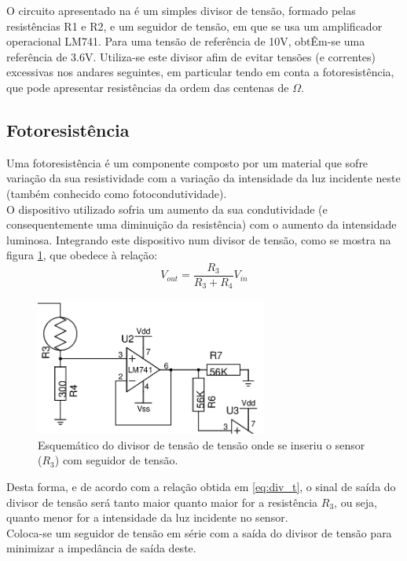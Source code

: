 \documentclass[%
  reprint,
  nofootinbib,
  amsmath,amssymb,
  aps,
  10pt,
  a4paper
]{revtex4-1}
\begin{document}

O circuito apresentado na  é um simples divisor de tensão, formado pelas resistências R1 e R2, e um seguidor de tensão, em que se usa um amplificador operacional LM741. Para uma tensão de referência de 10V, obtÊm-se uma referência de 3.6V. Utiliza-se este divisor afim de evitar tensões (e correntes) excessivas nos andares seguintes, em particular tendo em conta a fotoresistência, que pode apresentar resistências da ordem das centenas de $\Omega$.






\subsection{Fotoresistência}
Uma fotoresistência é um componente composto por um material que sofre variação da sua resistividade com a variação da intensidade da luz incidente neste (também conhecido como fotocondutividade).\\
O dispositivo utilizado sofria um aumento da sua condutividade (e consequentemente uma diminuição da resistência) com o aumento da intensidade luminosa. Integrando este dispositivo num divisor de tensão, como se mostra na figura \ref{fig:foto_res}, que obedece à relação:
\begin{equation}
V_{out}=\frac{R_3}{R_3+R_4}V_{in}
\label{eq:div_t}
\end{equation}
\begin{figure}[h]
\includegraphics[width=3in]{../img/sensor.png}
\caption{Esquemático do divisor de tensão de tensão onde se inseriu o sensor ($R_3$) com seguidor de tensão.}
\label{fig:foto_res}
\end{figure}
Desta forma, e de acordo com a relação obtida em \ref{eq:div_t}, o sinal de saída do divisor de tensão será tanto maior quanto maior for a resistência $R_3$, ou seja, quanto menor for a intensidade da luz incidente no sensor.\\
Coloca-se um seguidor de tensão em série com a saída do divisor de tensão para minimizar a impedância de saída deste.
\end{document}
